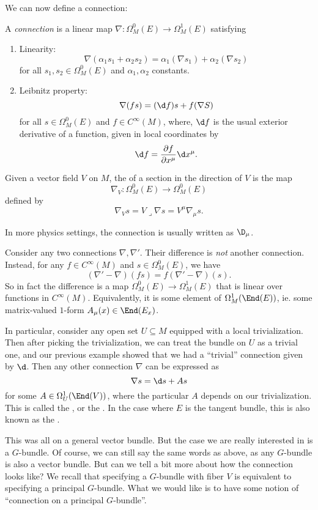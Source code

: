 \documentclass[a4paper]{article}
\begin{document}
We can now define a connection:
\begin{defi}[Connection]
  A \emph{connection} \index{$\nabla$} is a linear map $\nabla: \Omega_M^0(E) \to \Omega_M^1(E)$ satisfying
  \begin{enumerate}
    \item Linearity:
      \[
        \nabla(\alpha_1 s_1 + \alpha_2 s_2) = \alpha_1 (\nabla s_1) + \alpha_2( \nabla s_2)
      \]
      for all $s_1, s_2 \in \Omega_M^0(E)$ and $\alpha_1, \alpha_2$ constants.
    \item Leibnitz property:
      \[
        \nabla (fs) = (\d f) s + f (\nabla S)
      \]
      for all $s \in \Omega^0_M(E)$ and $f \in C^\infty(M)$, where, $\d f$ is the usual exterior derivative of a function, given in local coordinates by
      \[
        \d f = \frac{\partial f}{\partial x^\mu} \d x^\mu.
      \]
  \end{enumerate}
  Given a vector field $V$ on $M$, the  of a section in the direction of $V$ is the map
  \[
    \nabla_V: \Omega^0_M(E) \to \Omega^0_M(E)
  \]
  defined by
  \[
    \nabla_V s = V \lrcorner \nabla s = V^\mu \nabla_\mu s.
  \]
\end{defi}
In more physics settings, the connection is usually written as $\D_\mu$.

Consider any two connections $\nabla, \nabla'$. Their difference is \emph{not} another connection. Instead, for any $f \in C^\infty(M)$ and $s \in \Omega^0_M(E)$, we have
\[
  (\nabla' - \nabla)(fs) = f (\nabla' - \nabla)(s).
\]
So in fact the difference is a map $\Omega^0_M(E) \to \Omega_M^1(E)$ that is linear over functions in $C^\infty(M)$. Equivalently, it is some element of $\Omega^1_M(\End(E))$, ie. some matrix-valued $1$-form $A_\mu (x) \in \End(E_x)$.

In particular, consider any open set $U \subseteq M$ equipped with a local trivialization. Then after picking the trivialization, we can treat the bundle on $U$ as a trivial one, and our previous example showed that we had a ``trivial'' connection given by $\d$. Then any other connection $\nabla$ can be expressed as
\[
  \nabla s = \d s + A s
\]
for some $A \in \Omega^1_U(\End(V))$, where the particular $A$ depends on our trivialization. This is called the , or the . In the case where $E$ is the tangent bundle, this is also known as the .

This was all on a general vector bundle. But the case we are really interested in is a $G$-bundle. Of course, we can still say the same words as above, as any $G$-bundle is also a vector bundle. But can we tell a bit more about how the connection looks like? We recall that specifying a $G$-bundle with fiber $V$ is equivalent to specifying a principal $G$-bundle. What we would like is to have some notion of ``connection on a principal $G$-bundle''.
\end{document}
